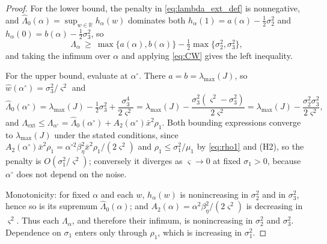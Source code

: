 \documentclass{article}
\newcommand{\betaeta}{\beta_\eta}
\newcommand{\Lext}{\Lambda_{\mathrm{ext}}}
\begin{document}
\begin{proof}
For the lower bound, the penalty in \eqref{eq:lambda_ext_def} is nonnegative, and
$\widehat\Lambda_0(\alpha)=\sup_{w\in\mathbb{R}}h_\alpha(w)$ dominates both $h_\alpha(1)=a(\alpha)-\tfrac12\sigma_2^2$ and $h_\alpha(0)=b(\alpha)-\tfrac12\sigma_3^2$, so
\[
\Lambda_\alpha\ \ge\ \max\{a(\alpha),b(\alpha)\}-\tfrac12\max\{\sigma_2^2,\sigma_3^2\},
\]
and taking the infimum over $\alpha$ and applying \eqref{eq:CW} gives the left inequality.

For the upper bound, evaluate at $\alpha^\circ$. There $a=b=\lambda_{\max}(J)$, so $\widehat w(\alpha^\circ)=\sigma_3^2/\varsigma^2$ and
\[
\widehat\Lambda_0(\alpha^\circ)=\lambda_{\max}(J)-\tfrac12\sigma_3^2+\frac{\sigma_3^4}{2\varsigma^2}=\lambda_{\max}(J)-\frac{\sigma_3^2(\varsigma^2-\sigma_3^2)}{2\varsigma^2}=\lambda_{\max}(J)-\frac{\sigma_2^2\sigma_3^2}{2\varsigma^2},
\]
and $\Lext\le\Lambda_{\alpha^\circ}=\widehat\Lambda_0(\alpha^\circ)+A_2(\alpha^\circ)\bar x^2\rho_1$. Both bounding expressions converge to $\lambda_{\max}(J)$ under the stated conditions, since $A_2(\alpha^\circ)\bar x^2\rho_1=\alpha^{\circ2}\betaeta^2\bar x^2\rho_1/(2\varsigma^2)$ and $\rho_1\le\sigma_1^2/\mu_1$ by \eqref{eq:rho1} and (H2), so the penalty is $O(\sigma_1^2/\varsigma^2)$; conversely it diverges as $\varsigma\to0$ at fixed $\sigma_1>0$, because $\alpha^\circ$ does not depend on the noise.

Monotonicity: for fixed $\alpha$ and each $w$, $h_\alpha(w)$ is nonincreasing in $\sigma_2^2$ and in $\sigma_3^2$, hence so is its supremum $\widehat\Lambda_0(\alpha)$; and $A_2(\alpha)=\alpha^2\betaeta^2/(2\varsigma^2)$ is decreasing in $\varsigma^2$. Thus each $\Lambda_\alpha$, and therefore their infimum, is nonincreasing in $\sigma_2^2$ and $\sigma_3^2$. Dependence on $\sigma_1$ enters only through $\rho_1$, which is increasing in $\sigma_1^2$.
\end{proof}
\end{document}

